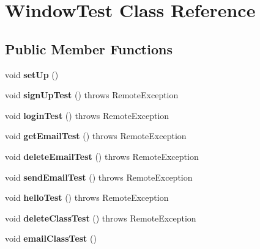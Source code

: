 \hypertarget{class_window_test}{}\section{Window\+Test Class Reference}
\label{class_window_test}
\subsection*{Public Member Functions}
\begin{DoxyCompactItemize}
\item 
\mbox{\label{class_window_test_a23f4768bcb10070dd2201c392b18215e}} 
void {\bfseries set\+Up} ()
\item 
\mbox{\label{class_window_test_a009c6c8d54ebf517d747d3ac6a59c416}} 
void {\bfseries sign\+Up\+Test} ()  throws Remote\+Exception 
\item 
\mbox{\label{class_window_test_a11f876a65af8afcad111927914caaf14}} 
void {\bfseries login\+Test} ()  throws Remote\+Exception 
\item 
\mbox{\label{class_window_test_ac4d8df65e85499d4f902a3fd4e69fc55}} 
void {\bfseries get\+Email\+Test} ()  throws Remote\+Exception 
\item 
\mbox{\label{class_window_test_a1da07b8ebcfb20f62e501e8d845ac1c8}} 
void {\bfseries delete\+Email\+Test} ()  throws Remote\+Exception 
\item 
\mbox{\label{class_window_test_a1c650f13b5330c5caf8b4b18e5669bec}} 
void {\bfseries send\+Email\+Test} ()  throws Remote\+Exception 
\item 
\mbox{\label{class_window_test_a93240d837e5ab179eb7c8fa602c987a2}} 
void {\bfseries hello\+Test} ()  throws Remote\+Exception 
\item 
\mbox{\label{class_window_test_aea5404003a54766a4d78c0fc92381418}} 
void {\bfseries delete\+Class\+Test} ()  throws Remote\+Exception 
\item 
\mbox{\label{class_window_test_aeb395b08c31ecbe18a14c77903718450}} 
void {\bfseries email\+Class\+Test} ()
\end{DoxyCompactItemize}
